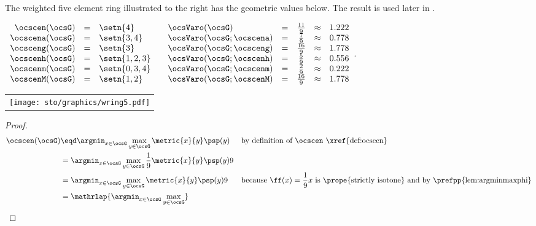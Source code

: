 \begin{tabstr}{0.75}
\begin{example}
\label{ex:wring5}
The weighted five element ring illustrated to the right has the geometric values below.
The  result is used later in .
\\\begin{minipage}{\tw-65mm}%
\indentx$\begin{array}{rcl @{\qquad} lcccl}
    \ocscen (\ocsG) &=&\setn{4}      & \ocsVaro(\ocsG)          &=& \frac{11}{9} &\approx& 1.222 \\
    \ocscena(\ocsG) &=&\setn{3,4}    & \ocsVaro(\ocsG;\ocscena) &=& \frac{ 7}{9} &\approx& 0.778\\
    \ocsceng(\ocsG) &=&\setn{3}      & \ocsVaro(\ocsG;\ocsceng) &=& \frac{16}{9} &\approx& 1.778\\
    \ocscenh(\ocsG) &=&\setn{1,2,3}  & \ocsVaro(\ocsG;\ocscenh) &=& \frac{5}{9}  &\approx& 0.556\\
    \ocscenm(\ocsG) &=&\setn{0,3,4}  & \ocsVaro(\ocsG;\ocscenm) &=& \frac{2}{9}  &\approx& 0.222\\
    \ocscenM(\ocsG) &=&\setn{1,2}    & \ocsVaro(\ocsG;\ocscenM) &=& \frac{16}{9} &\approx& 1.778
  \end{array}$.
\end{minipage}\hfill%
\begin{tabular}{c}
  \gsize%
  {\texttt{[image: sto/graphics/wring5.pdf]}}%
\end{tabular}
\end{example}
\begin{proof}
    \begin{align*}
      \ocscen(\ocsG)
        &\eqd \argmin_{x\in\ocsG}\max_{y\in\ocsG}\metric{x}{y}\psp(y)
        &&\text{by definition of $\ocscen$ \xref{def:ocscen}}
      \\&= \argmin_{x\in\ocsG}\max_{y\in\ocsG}\frac{1}{9}\metric{x}{y}\psp(y)9
      \\&= \argmin_{x\in\ocsG}\max_{y\in\ocsG}\metric{x}{y}\psp(y)9
        &&\text{because $\ff(x)=\frac{1}{9}x$ is \prope{strictly isotone} and by \prefpp{lem:argminmaxphi}}
      \\&=\mathrlap{\argmin_{x\in\ocsG}\max_{y\in\ocsG}
}
\end{align*}
\end{proof}
\end{tabstr}
